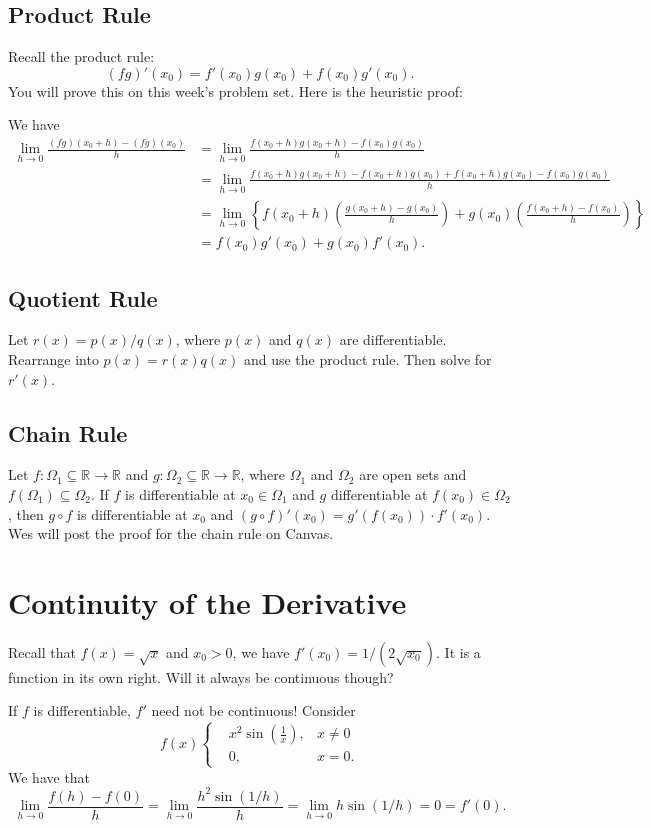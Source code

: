 \documentclass[11pt]{article}
\theoremstyle{definition}
\newcommand{\R}{\mathbb{R}}                      %
\begin{document}
\subsection{Product Rule}
Recall the product rule:
$$
(fg)'(x_0)=f'(x_0)g(x_0)+f(x_0)g'(x_0).
$$
You will prove this on this week's problem set. Here is the heuristic proof:

We have
$$
\begin{aligned}
\lim_{h\to 0}\frac{(fg)(x_0+h)-(fg)(x_0)}{h}&=\lim_{h\to 0}\frac{f(x_0+h)g(x_0+h)-f(x_0)g(x_0)}{h}\\
&= \lim_{h\to 0}\frac{f(x_0+h)g(x_0+h)-f(x_0+h)g(x_0)+f(x_0+h)g(x_0)-f(x_0)g(x_0)}{h}\\
&=\lim_{h\to 0}\left\{f(x_0+h)\left(\frac{g(x_0+h)-g(x_0)}{h}\right)+g(x_0)\left(\frac{f(x_0+h)-f(x_0)}{h}\right)\right\}\\
&=f(x_0)g'(x_0)+g(x_0)f'(x_0).
\end{aligned}
$$

\subsection{Quotient Rule}
Let $r(x)=p(x)/q(x)$, where $p(x)$ and $q(x)$ are differentiable. Rearrange into $p(x)=r(x)q(x)$ and use the product rule. Then solve for $r'(x)$.

\subsection{Chain Rule}
Let $f:\Omega_1\subseteq \R\to\R$ and $g:\Omega_2\subseteq \R\to\R$, where $\Omega_1$ and $\Omega_2$ are open sets and $f(\Omega_1)\subseteq\Omega_2$. If $f$ is differentiable at $x_0\in\Omega_1$ and $g$ differentiable at $f(x_0)\in\Omega_2$, then $g\circ f$ is differentiable at $x_0$ and $(g\circ f)'(x_0)=g'(f(x_0))\cdot f'(x_0)$. Wes will post the proof for the chain rule on Canvas.

\section{Continuity of the Derivative}
Recall that $f(x)=\sqrt{x}$ and $x_0>0$, we have $f'(x_0)=1/(2\sqrt{x_0})$. It is a function in its own right. Will it always be continuous though?

\ex If $f$ is differentiable, $f'$ need not be continuous! Consider
$$
f(x)\left\{\begin{aligned}
&x^2\sin{\left(\frac{1}{x}\right)},&x\neq0\\
&0,&x=0.
\end{aligned}\right.
$$
We have that 
$$
\lim_{h\to 0}\frac{f(h)-f(0)}{h}=\lim_{h\to 0}\frac{h^2\sin(1/h)}{h}=\lim_{h\to 0}h\sin(1/h)=0=f'(0).
$$
\end{document}

